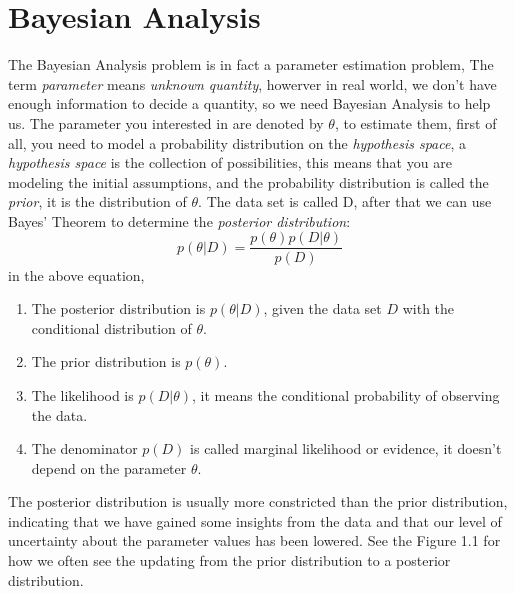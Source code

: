 \documentclass[11pt]{book}
\begin{document}
\section{Bayesian Analysis} 
The Bayesian Analysis problem is in fact a parameter estimation problem, 
The term \textit{parameter} means \textit{unknown quantity}, howerver in real world, we don't 
have enough information to decide a quantity, so we need Bayesian Analysis to help us.
The parameter you interested in are denoted by $\theta$, to estimate them, first of all, you need to 
model a probability distribution on the \textit{hypothesis space}, a \textit{hypothesis space} is the 
collection of possibilities, this means that you are modeling the initial assumptions, and the probability distribution
is called the \textit{prior}, it is the distribution of $\theta$. The data set is called D, 
after that we can use Bayes’ Theorem to determine the \textit{posterior distribution}:
\begin{equation}
	p(\theta|D) = \frac{p{(\theta)}p(D|\theta)}{p(D)}
\end{equation}
in the above equation, 
\begin{enumerate}
\item The posterior distribution is $p(\theta|D)$, given the data set $D$ with the conditional distribution of $\theta$.
 \item The prior distribution is $p{(\theta)}$.
 \item The likelihood is $p(D|\theta)$, it means the conditional probability of observing the data.
 \item  The denominator $p(D)$ is called marginal likelihood or evidence, it doesn't depend on the parameter $\theta$.
\end{enumerate}
 The posterior distribution is usually more constricted than the prior distribution, 
 indicating that we have gained some insights from the data and that our level of uncertainty about the parameter values has been lowered.
 See the Figure 1.1 for how we often see the updating from the prior distribution to a posterior distribution.
\end{document}
